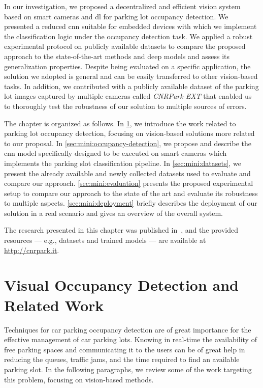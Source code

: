 In our investigation, we proposed a decentralized and efficient vision system based on smart cameras and \gls{dl} for parking lot occupancy detection.
We presented a reduced \gls{cnn} suitable for embedded devices with which we implement the classification logic under the occupancy detection task.
We applied a robust experimental protocol on publicly available datasets to compare the proposed approach to the state-of-the-art methods and deep models and assess its generalization properties.
Despite being evaluated on a specific application, the solution we adopted is general and can be easily transferred to other vision-based tasks.
In addition, we contributed with a publicly available dataset of the parking lot images captured by multiple cameras called \emph{CNRPark-EXT} that enabled us to thoroughly test the robustness of our solution to multiple sources of errors.

The chapter is organized as follows.
In \ref{sec:mini:related-work}, we introduce the work related to parking lot occupancy detection, focusing on vision-based solutions more related to our proposal.
In \ref{sec:mini:occupancy-detection}, we propose and describe the \gls{cnn} model specifically designed to be executed on smart cameras which implements the parking slot classification pipeline.
In \ref{sec:mini:datasets}, we present the already available and newly collected datasets used to evaluate and compare our approach.
\ref{sec:mini:evaluation} presents the proposed experimental setup to compare our approach to the state of the art and evaluate its robustness to multiple aspects.
\ref{sec:mini:deployment} briefly describes the deployment of our solution in a real scenario and gives an overview of the overall system.

The research presented in this chapter was published in~\cite{amato2016car,amato2017deep}, and the provided resources --- e.g., datasets and trained models --- are available at \url{http://cnrpark.it}.

\section{Visual Occupancy Detection and Related Work}
\label{sec:mini:related-work}

Techniques for car parking occupancy detection are of great importance for the effective management of car parking lots.
Knowing in real-time the availability of free parking spaces and communicating it to the users can be of great help in reducing the queues, traffic jams, and the time required to find an available parking slot.
In the following paragraphs, we review some of the work targeting this problem, focusing on vision-based methods.

